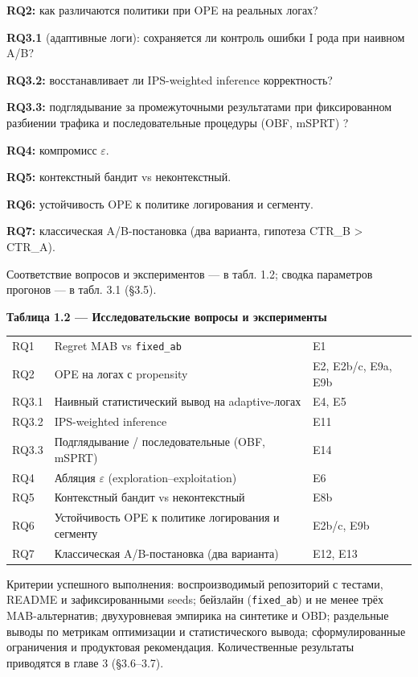 \textbf{RQ2:} как различаются политики при OPE на реальных логах? 

\textbf{RQ3.1} (адаптивные логи): сохраняется ли контроль ошибки I рода при наивном A/B? 

\textbf{RQ3.2:} восстанавливает ли IPS-weighted inference корректность? 

\textbf{RQ3.3:} подглядывание за промежуточными результатами при фиксированном разбиении трафика и последовательные процедуры (OBF, mSPRT) \cite{ref19,ref33}? 

\textbf{RQ4:} компромисс $\varepsilon$. 

\textbf{RQ5:} контекстный бандит vs неконтекстный. 

\textbf{RQ6:} устойчивость OPE к политике логирования и сегменту. 

\textbf{RQ7:} классическая A/B-постановка (два варианта, гипотеза CTR\_B \textgreater{} CTR\_A).

Соответствие вопросов и экспериментов --- в табл. 1.2; сводка параметров прогонов --- в табл. 3.1 (§3.5).

\textbf{Таблица 1.2 --- Исследовательские вопросы и эксперименты}

\begingroup\footnotesize\setlength{\tabcolsep}{4pt}
\begin{xltabular}{\linewidth}{@{}
  >{\raggedright\arraybackslash}Y
  >{\raggedright\arraybackslash}Y
  >{\raggedright\arraybackslash}Y@{}}
\toprule\noalign{}
\midrule\noalign{}
\endhead
\bottomrule\noalign{}
\endlastfoot
RQ1 & Regret MAB vs \texttt{fixed\_ab} & E1 \\
RQ2 & OPE на логах с propensity & E2, E2b/c, E9a, E9b \\
RQ3.1 & Наивный статистический вывод на adaptive-логах & E4, E5 \\
RQ3.2 & IPS-weighted inference & E11 \\
RQ3.3 & Подглядывание / последовательные (OBF, mSPRT) & E14 \\
RQ4 & Абляция $\varepsilon$ (exploration--exploitation) & E6 \\
RQ5 & Контекстный бандит vs неконтекстный & E8b \\
RQ6 & Устойчивость OPE к политике логирования и сегменту & E2b/c, E9b \\
RQ7 & Классическая A/B-постановка (два варианта) & E12, E13 \\
\end{xltabular}
\endgroup

Критерии успешного выполнения: воспроизводимый репозиторий с тестами, README и зафиксированными seeds; бейзлайн (\texttt{fixed\_ab}) и не менее трёх MAB-альтернатив; двухуровневая эмпирика на синтетике и OBD; раздельные выводы по метрикам оптимизации и статистического вывода; сформулированные ограничения и продуктовая рекомендация. Количественные результаты приводятся в главе 3 (§3.6--3.7).

